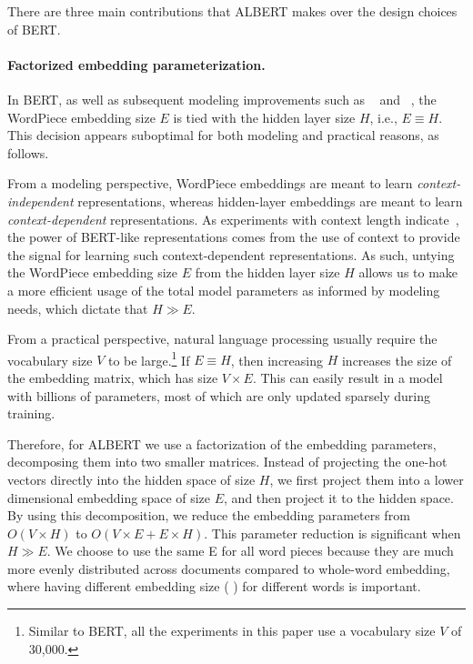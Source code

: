There are three main contributions that ALBERT makes over the design choices of BERT.

\paragraph{Factorized embedding parameterization.}
In BERT, as well as subsequent modeling improvements such as \xlnet~\citep{yang2019xlnet} and \roberta~\citep{liu2019roberta}, the WordPiece embedding size $E$ is tied with the hidden layer size $H$, i.e., $E\equiv H$.
This decision appears suboptimal for both modeling and practical reasons, as follows.

From a modeling perspective, WordPiece embeddings are meant to learn {\em context-independent} representations, whereas hidden-layer embeddings are meant to learn {\em context-dependent} representations.
As experiments with context length indicate~\citep{liu2019roberta}, the power of BERT-like representations comes from the use of context to provide the signal for learning such context-dependent representations.
As such, untying the WordPiece embedding size $E$ from the hidden layer size $H$ allows us to make a more efficient usage of the total model parameters as informed by modeling needs, which dictate that $H \gg E$. 

From a practical perspective, natural language processing usually require the vocabulary size $V$ to be large.\footnote{Similar to BERT, all the experiments in this paper use a vocabulary size $V$ of 30,000.} 
If $E\equiv H$, then increasing $H$ increases the size of the embedding matrix, which has size $V \times E$.
This can easily result in a model with billions of parameters, most of which are only updated sparsely during training. 

Therefore, for ALBERT we use a factorization of the embedding parameters, decomposing them into two smaller matrices.
Instead of projecting the one-hot vectors directly into the hidden space of size $H$, we first project them into a lower dimensional embedding space of size $E$, and then project it to the hidden space.
By using this decomposition, we reduce the embedding parameters from $O(V \times H)$  to $O(V \times E + E \times H)$.
This parameter reduction is significant when $H \gg E$. We choose to use the same E for all word pieces because they are much more evenly distributed across documents compared to whole-word embedding, where having different embedding size  (\cite{grave2017efficient, baevski2018adaptive,dai2019transformer} ) for different words is important.  


